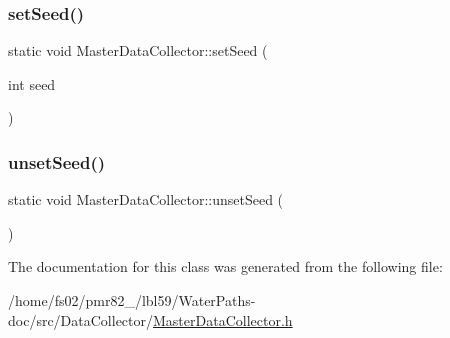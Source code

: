 \subsubsection{\texorpdfstring{set\+Seed()}{setSeed()}}
{\footnotesize\ttfamily static void Master\+Data\+Collector\+::set\+Seed (\begin{DoxyParamCaption}\item[{int}]{seed }\end{DoxyParamCaption})\hspace{0.3cm}{\ttfamily [static]}}

\mbox{\label{classMasterDataCollector_ade426952ec26ca85a724075f617e6454}} 
\subsubsection{\texorpdfstring{unset\+Seed()}{unsetSeed()}}
{\footnotesize\ttfamily static void Master\+Data\+Collector\+::unset\+Seed (\begin{DoxyParamCaption}{ }\end{DoxyParamCaption})\hspace{0.3cm}{\ttfamily [static]}}



The documentation for this class was generated from the following file\+:\begin{DoxyCompactItemize}
\item 
/home/fs02/pmr82\+\_/lbl59/\+Water\+Paths-\/doc/src/\+Data\+Collector/\mbox{\hyperlink{MasterDataCollector_8h}{Master\+Data\+Collector.\+h}}\end{DoxyCompactItemize}
